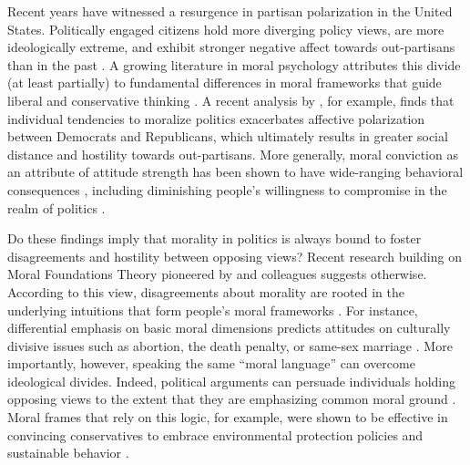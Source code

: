 
Recent years have witnessed a resurgence in partisan polarization in the United States. Politically engaged citizens hold more diverging policy
views, are more ideologically extreme, and exhibit stronger negative affect towards out-partisans than in the past \citep{hetherington2001resurgent, abramowitz2008polarization, iyengar2012affect, mason2014disrespectfully, huddy2015expressive, iyengar2015fear}. A growing literature in moral psychology attributes this divide (at least partially) to fundamental differences in moral frameworks that guide liberal and conservative thinking \citep[e.g.,][]{haidt2012righteous,graham2013moral}. A recent analysis by \citet{garrett2018moral}, for example, finds that individual tendencies to moralize politics exacerbates affective polarization between Democrats and Republicans, which ultimately results in greater social distance and hostility towards out-partisans. More generally, moral conviction as an attribute of attitude strength has been shown to have wide-ranging behavioral consequences \citep{skitka2005moral,skitka2014social}, including diminishing people's willingness to compromise in the realm of politics \citep{ryan2014reconsidering,ryan2017no}.

Do these findings imply that morality in politics is always bound to foster disagreements and hostility between opposing views? Recent research building on Moral Foundations Theory pioneered by \citet{haidt2007new} and colleagues suggests otherwise. According to this view, disagreements about morality are rooted in the underlying intuitions that form people's moral frameworks \citep{haidt2012righteous}. For instance, differential emphasis on basic moral dimensions predicts attitudes on culturally divisive issues such as abortion, the death penalty, or same-sex marriage \citep{koleva2012tracing}. More importantly, however, speaking the same ``moral language'' can overcome ideological divides. Indeed, political arguments can persuade individuals holding opposing views to the extent that they are emphasizing common moral ground \citep[e.g.,][]{day2014shifting,feinberg2015gulf}. Moral frames that rely on this logic, for example, were shown to be effective in convincing conservatives to embrace environmental protection policies and sustainable behavior \citep{kidwell2013getting,feinberg2013moral}.

